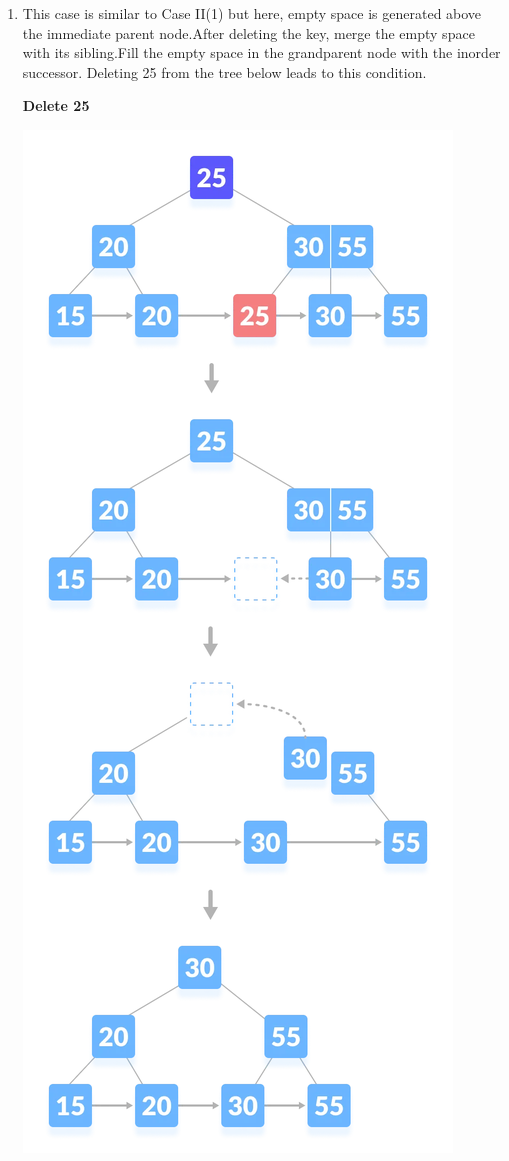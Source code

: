 \documentclass{article}
\begin{document}
\begin{itemize}
\begin{enumerate}
            \newpage
            \item This case is similar to Case II(1) but here, empty space is generated above the immediate parent node.After deleting the key, merge the empty space with its sibling.Fill the empty space in the grandparent node with the inorder successor. Deleting 25 from the tree below leads to this condition. \\
            \begin{center}
                 \color{red}\textbf{Delete 25}
            \end{center}
            \centering \includegraphics[scale = 0.4]{Images/deletion-5.png}
        \end{enumerate}
    \end{itemize}
\end{document}
